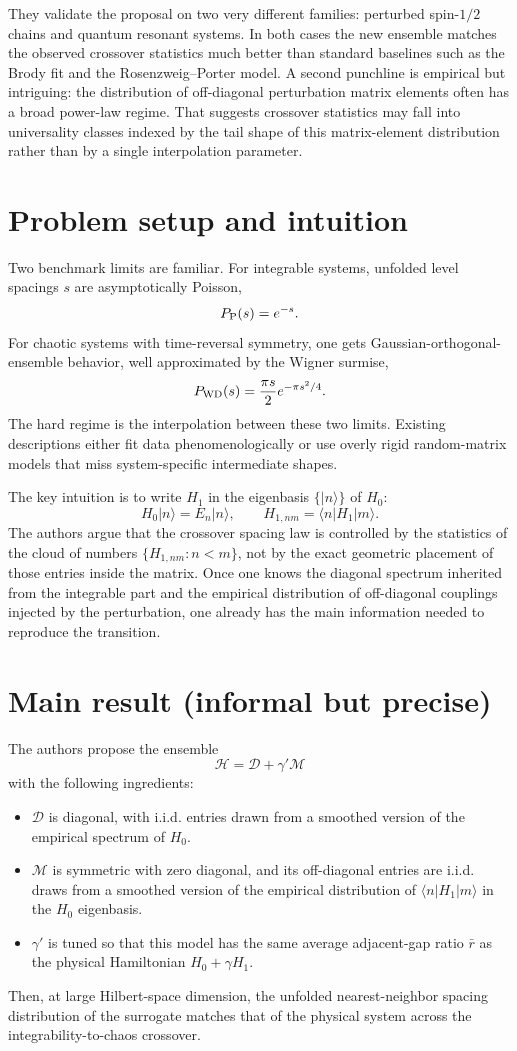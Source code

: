 \documentclass[11pt]{article}
\begin{document}
They validate the proposal on two very different families: perturbed spin-$1/2$ chains and quantum resonant systems. In both cases the new ensemble matches the observed crossover statistics much better than standard baselines such as the Brody fit and the Rosenzweig--Porter model. A second punchline is empirical but intriguing: the distribution of off-diagonal perturbation matrix elements often has a broad power-law regime. That suggests crossover statistics may fall into universality classes indexed by the tail shape of this matrix-element distribution rather than by a single interpolation parameter.

\section*{Problem setup and intuition}
Two benchmark limits are familiar. For integrable systems, unfolded level spacings $s$ are asymptotically Poisson,
\[
P_{\rm P}(s)=e^{-s}.
\]
For chaotic systems with time-reversal symmetry, one gets Gaussian-orthogonal-ensemble behavior, well approximated by the Wigner surmise,
\[
P_{\rm WD}(s)=\frac{\pi s}{2}e^{-\pi s^2/4}.
\]
The hard regime is the interpolation between these two limits. Existing descriptions either fit data phenomenologically or use overly rigid random-matrix models that miss system-specific intermediate shapes.

The key intuition is to write $H_1$ in the eigenbasis $\{|n\rangle\}$ of $H_0$:
\[
H_0 |n\rangle = E_n |n\rangle, \qquad H_{1,nm}=\langle n|H_1|m\rangle.
\]
The authors argue that the crossover spacing law is controlled by the statistics of the cloud of numbers $\{H_{1,nm}: n<m\}$, not by the exact geometric placement of those entries inside the matrix. Once one knows the diagonal spectrum inherited from the integrable part and the empirical distribution of off-diagonal couplings injected by the perturbation, one already has the main information needed to reproduce the transition.

\section*{Main result (informal but precise)}
The authors propose the ensemble
\[
\mathcal H = \mathcal D + \gamma'\mathcal M
\]
with the following ingredients:
\begin{itemize}
\item $\mathcal D$ is diagonal, with i.i.d. entries drawn from a smoothed version of the empirical spectrum of $H_0$.
\item $\mathcal M$ is symmetric with zero diagonal, and its off-diagonal entries are i.i.d. draws from a smoothed version of the empirical distribution of $\langle n|H_1|m\rangle$ in the $H_0$ eigenbasis.
\item $\gamma'$ is tuned so that this model has the same average adjacent-gap ratio $\bar r$ as the physical Hamiltonian $H_0+\gamma H_1$.
\end{itemize}
Then, at large Hilbert-space dimension, the unfolded nearest-neighbor spacing distribution of the surrogate matches that of the physical system across the integrability-to-chaos crossover.
\end{document}
